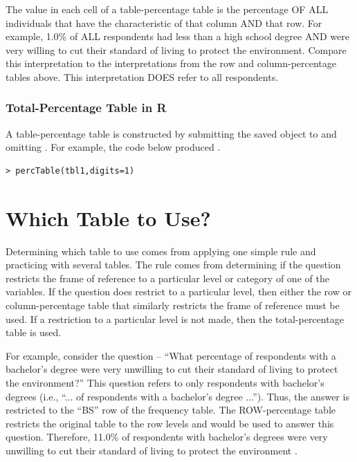 \documentclass[10pt,openany]{book}\usepackage[]{graphicx}\usepackage[]{color}
\makeatletter
\newenvironment{kframe}{%
 \def\at@end@of@kframe{}%
 \ifinner\ifhmode%
  \def\at@end@of@kframe{\end{minipage}}%
  \begin{minipage}{\columnwidth}%
 \fi\fi%
 \def\FrameCommand##1{\hskip\@totalleftmargin \hskip-\fboxsep
 \colorbox{shadecolor}{##1}\hskip-\fboxsep
     \hskip-\linewidth \hskip-\@totalleftmargin \hskip\columnwidth}%
 \MakeFramed {\advance\hsize-\width
   \@totalleftmargin\z@ \linewidth\hsize
   \@setminipage}}%
 {\par\unskip\endMakeFramed%
 \at@end@of@kframe}
\newenvironment{knitrout}{}{} %
\makeatother
\begin{document}
The value in each cell of a table-percentage table is the percentage OF ALL individuals that have the characteristic of that column AND that row. For example, 1.0\% of ALL respondents had less than a high school degree AND were very willing to cut their standard of living to protect the environment. Compare this interpretation to the interpretations from the row and column-percentage tables above. This interpretation DOES refer to all respondents.

\subsubsection*{Total-Percentage Table in R}
A table-percentage table is constructed by submitting the saved  object to  and omitting . For example, the code below produced .
\begin{knitrout}
\color{fgcolor}\begin{kframe}
\begin{verbatim}
> percTable(tbl1,digits=1)
\end{verbatim}
\end{kframe}
\end{knitrout}


\section{Which Table to Use?}
Determining which table to use comes from applying one simple rule and practicing with several tables. The rule comes from determining if the question restricts the frame of reference to a particular level or category of one of the variables. If the question does restrict to a particular level, then either the row or column-percentage table that similarly restricts the frame of reference must be used. If a restriction to a particular level is not made, then the total-percentage table is used.

For example, consider the question -- ``What percentage of respondents with a bachelor's degree were very unwilling to cut their standard of living to protect the environment?''  This question refers to only respondents with bachelor's degrees (i.e., ``... of respondents with a bachelor's degree ...''). Thus, the answer is restricted to the ``BS'' row of the frequency table. The ROW-percentage table restricts the original table to the row levels and would be used to answer this question. Therefore, 11.0\% of respondents with bachelor's degrees were very unwilling to cut their standard of living to protect the environment .
\end{document}
